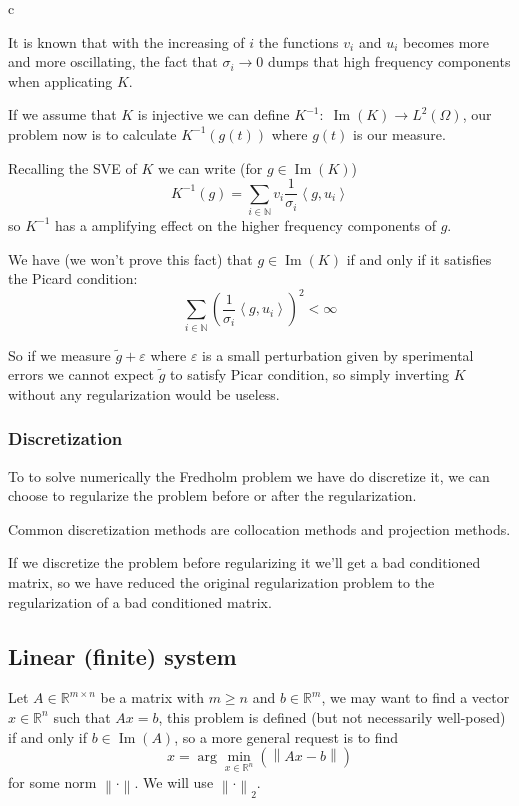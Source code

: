 c\documentclass[a4paper,10pt]{article}
\theoremstyle{plain}
\theoremstyle{definition}
\theoremstyle{remark}
\newcommand{\pa}[1]{\left(#1\right)}
\newcommand{\ang}[1]{\left<#1\right>}
\newcommand{\norm}[1]{\left\|#1\right\|}
\DeclareMathOperator{\im}{Im}
\begin{document}
It is known that with the increasing of $i$ the functions $v_i$ and
$u_i$ becomes more and more oscillating, the fact that $\sigma _i \to
0$ dumps that high frequency components when applicating $K$.


If we assume that $K$ is injective we can define $K^{-1}:\; \im(K) \to
L^2(\Omega)$, our problem now is to calculate $K^{-1}(g(t))$ where
$g(t)$ is our measure.

Recalling the SVE of $K$ we can write (for $g\in \im(K)$)
\begin{equation}
  \label{eq:inverseSVE}
  K^{-1}(g) = \sum _{i\in \mathbb{N}} v_i \frac{1}{\sigma _i} \ang{g,u_i}
\end{equation}
so $K^{-1}$ has a amplifying effect on the higher frequency components
of $g$.

We have (we won't prove this fact) that $g\in \im (K)$ if and only if
it satisfies the Picard condition:
\[ \sum _{i\in \mathbb{N}} \pa{ \frac{1}{\sigma _i} \ang{g,u_i}} ^2 <
\infty \] 

So if we measure $\tilde g + \varepsilon$ where $\varepsilon$ is a
small perturbation given by sperimental errors we cannot expect
$\tilde g$ to satisfy Picar condition, so simply inverting $K$ without
any regularization would be useless.


\subsubsection{Discretization}
\label{sec:fredholmdiscretization}

To to solve numerically the Fredholm problem we have do discretize it,
we can choose to regularize the problem before or after the
regularization.

Common discretization methods are collocation methods and projection
methods.

If we discretize the problem before regularizing it we'll get a bad
conditioned matrix, so we have reduced the original regularization
problem to the regularization of a bad conditioned matrix.

\subsection{Linear (finite) system}
\label{sec:exmatrix}

Let $A\in \mathbb{R}^{m \times n}$ be a matrix with $m \ge n$ and $b
\in \mathbb{R}^m$, we may want to find a vector $x \in \mathbb{R}^n$
such that $Ax = b$, this problem is defined (but not necessarily
well-posed) if and only if $b\in \im (A)$, so a more general request
is to find
\begin{equation}
  \label{eq:minxunreg}
  x = \arg\min _{x\in \mathbb{R}^n} \pa{ \norm{Ax -b} }
\end{equation}
for some norm $\norm{\cdot}$. We will use $\norm{\cdot}_2$.
\end{document}
